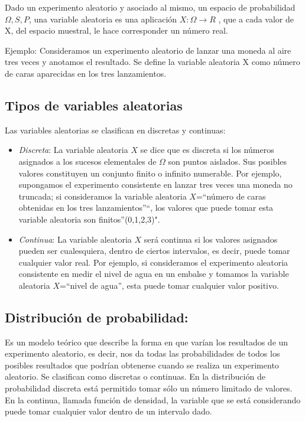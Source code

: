 \documentclass[
  12pt,
]{krantz}
\theoremstyle{definition}
\theoremstyle{definition}
\theoremstyle{definition}
\theoremstyle{remark}
\let\BeginKnitrBlock\begin \let\EndKnitrBlock\end
\begin{document}
\BeginKnitrBlock{definition}
\protect\hypertarget{def:defi-var-alea}{}{\label{def:defi-var-alea} }Dado un experimento aleatorio y asociado al mismo, un espacio de probabilidad \(\Omega, S, P\), una variable aleatoria es una aplicación \(X : \Omega → R\) , que a cada valor de X, del espacio muestral, le hace corresponder un número real.
\EndKnitrBlock{definition}

Ejemplo: Consideramos un experimento aleatorio de lanzar una moneda al aire tres veces y anotamos el resultado. Se define la variable aleatoria X como número de caras aparecidas en los tres lanzamientos.

\hypertarget{tipos-de-variables-aleatorias}{%
\subsection{Tipos de variables aleatorias}\label{tipos-de-variables-aleatorias}}

Las variables aleatorias se clasifican en discretas y continuas:

\begin{itemize}
\item
  \emph{Discreta}: La variable aleatoria \(X\) se dice que es discreta si los números asignados a los sucesos elementales de \(\Omega\) son puntos aislados. Sus posibles valores constituyen un conjunto finito o infinito numerable. Por ejemplo, supongamos el experimento consistente en lanzar tres veces una moneda no truncada; si consideramos la variable aleatoria \(X\)=``número de caras obtenidas en los tres lanzamientos''``, los valores que puede tomar esta variable aleatoria son finitos''(0,1,2,3)".
\item
  \emph{Continua}: La variable aleatoria \(X\) será continua si los valores asignados pueden ser cualesquiera, dentro de ciertos intervalos, es decir, puede tomar cualquier valor real. Por ejemplo, si consideramos el experimento aleatoria consistente en medir el nivel de agua en un embalse y tomamos la variable aleatoria \(X\)=``nivel de agua'', esta puede tomar cualquier valor positivo.
\end{itemize}

\hypertarget{distribucion-de-probabilidad}{%
\subsection{Distribución de probabilidad:}\label{distribucion-de-probabilidad}}

Es un modelo teórico que describe la forma en que varían los resultados de un experimento aleatorio, es decir, nos da todas las probabilidades de todos los posibles resultados que podrían obtenerse cuando se realiza un experimento aleatorio. Se clasifican como discretas o continuas. En la distribución de probabilidad discreta está permitido tomar sólo un número limitado de valores. En la continua, llamada función de densidad, la variable que se está considerando puede tomar cualquier valor dentro de un intervalo dado.
\end{document}
